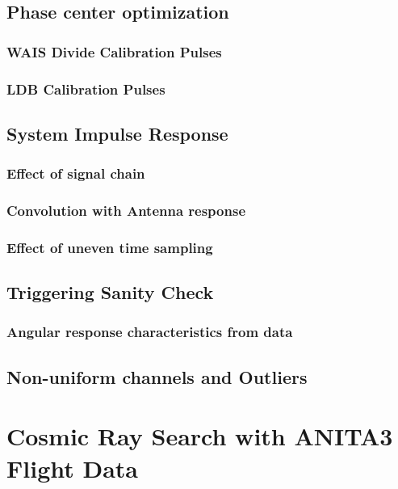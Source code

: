 \documentclass[11pt]{uhthesis}
\begin{document}
\section{Phase center optimization}

	\subsection{WAIS Divide Calibration Pulses}
	
	\subsection{LDB Calibration Pulses}

\section{System Impulse Response}
	\subsection{Effect of signal chain}
	
	\subsection{Convolution with Antenna response}
	
	\subsection{Effect of uneven time sampling}

\section{Triggering Sanity Check}

	\subsection{Angular response characteristics from data}

\section{Non-uniform channels and Outliers}

\chapter{Cosmic Ray Search with ANITA3 Flight Data}
\end{document}
